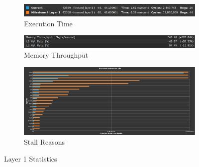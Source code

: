\documentclass{article}
\begin{document}
\begin{figure}[H]
    \centering
    \begin{subfigure}[b]{\linewidth}
        \includegraphics[width=\linewidth]{final_layer1_summary}
        \caption{Execution Time}
    \end{subfigure}
    \begin{subfigure}[b]{\linewidth}
        \includegraphics[width=\linewidth]{final_layer1_mem}
        \caption{Memory Throughput}
    \end{subfigure}
    \begin{subfigure}[b]{\linewidth}
        \includegraphics[width=\linewidth]{final_layer1_opcode}
        \caption{Stall Reasons}
    \end{subfigure}
    \caption{Layer 1 Statistics}
\end{figure}
\end{document}

